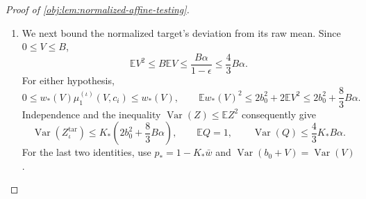 \documentclass[11pt]{article}
\begin{document}
\begin{proof}[Proof of \cref{obj:lem:normalized-affine-testing}]
\begin{enumerate}
Uniformly ordering each channel's histogram is another common probability kernel. Its conditional law is the ordered Poisson experiment from the normalized table. To see this, for a probability mass function \(p_{\mathrm{mark}}\) on a finite alphabet \(\mathscr Z\), put
\[
\kappa_{\mathrm{tot}}=\sum_{z\in\mathscr Z}\kappa_z.
\]
The independent-count probabilities factor as
\[
\prod_{z\in\mathscr Z}
e^{-\lambda_{\mathrm P}p_{\mathrm{mark}}(z)}
\frac{(\lambda_{\mathrm P}p_{\mathrm{mark}}(z))^{\kappa_z}}{\kappa_z!}
=
e^{-\lambda_{\mathrm P}}
\frac{\lambda_{\mathrm P}^{\kappa_{\mathrm{tot}}}}{\kappa_{\mathrm{tot}}!}
\frac{\kappa_{\mathrm{tot}}!}{\prod_z\kappa_z!}
\prod_zp_{\mathrm{mark}}(z)^{\kappa_z}.
\]
Thus, conditional on the latent table, the ordered channels have the following law:
\[
\begin{aligned}
J_{\mathrm L}&\sim\operatorname{Poi}(uQ),&
\mathcal L_{\mathrm{raw}}\mid J_{\mathrm L}=k
&\sim P_\iota(\boldsymbol\lambda)^{\otimes k},\\
J_{\mathrm A}&\sim\operatorname{Poi}(wQ),&
\mathcal X_{\mathrm{raw}}\mid J_{\mathrm A}=k
&\sim(P_\iota(\boldsymbol\lambda))_{XA}^{\otimes k}.
\end{aligned}
\]
Both channels are independent conditional on the latent table. Their domains are
\[
\mathcal L_{\mathrm{raw}}\in
\bigsqcup_{k\ge0}
\bigl(\{1,\ldots,d\}\times\{0,1\}^2\bigr)^k,
\qquad
\mathcal X_{\mathrm{raw}}\in
\bigsqcup_{k\ge0}
\bigl(\{1,\ldots,d\}\times\{0,1\}\bigr)^k,
\]
with the empty tuple at length zero.

Append the independent seed \(U\sim\mathrm{Uniform}[0,1]\), and define
\[
\mathcal Q_\iota^{\mathrm{raw}}
=\operatorname{Law}(\mathcal L_{\mathrm{raw}},
                    \mathcal X_{\mathrm{raw}},U\mid\iota),
\]
where the latent table is mixed according to \(\nu_{\mathrm{lat}}\). Common kernels and a common independent seed preserve the distance bound, so
\[
\operatorname{TV}(\mathcal Q_1^{\mathrm{raw}},
                  \mathcal Q_0^{\mathrm{raw}})<\frac1{64}.
\]

\item
We next bound the normalized target's deviation from its raw mean. Since \(0\le V\le B\),
\[
\mathbb EV^2\le B\mathbb EV
\le\frac{B\alpha}{1-\epsilon}
\le\frac43B\alpha.
\]
For either hypothesis,
\[
0\le w_*(V)\mu_1^{(\iota)}(V,c_i)\le w_*(V),
\qquad
\mathbb Ew_*(V)^2
\le2b_0^2+2\mathbb EV^2
\le2b_0^2+\frac83B\alpha.
\]
Independence and the inequality
\(\operatorname{Var}(Z)\le\mathbb EZ^2\) consequently give
\[
\operatorname{Var}(Z_\iota^{\mathrm{tar}})
\le K_*\left(2b_0^2+\frac83B\alpha\right),
\qquad
\mathbb EQ=1,
\qquad
\operatorname{Var}(Q)\le\frac43K_*B\alpha.
\]
For the last two identities, use \(p_*=1-K_*\bar w\) and
\(\operatorname{Var}(b_0+V)=\operatorname{Var}(V)\).


\end{enumerate}
\end{proof}
\end{document}
